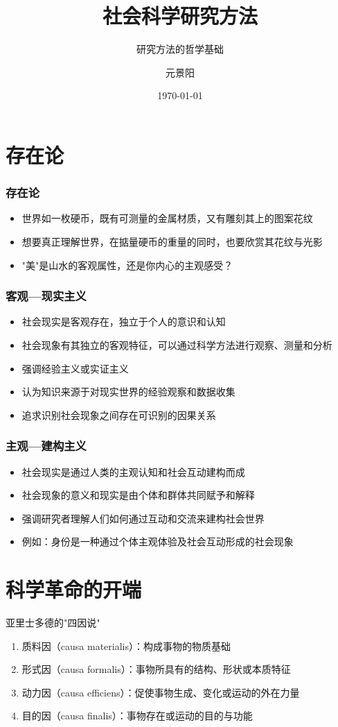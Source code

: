 \documentclass{beamer}
\title{社会科学研究方法}
\subtitle{研究方法的哲学基础}
\author{元景阳}
\institute{南京财经大学金融学院（已毕业）}
\date{\today}
\begin{document}
\kaishu

\frame{\titlepage}

\section{存在论}
\begin{frame}
\frametitle{存在论}
\begin{itemize}
\item 世界如一枚硬币，既有可测量的金属材质，又有雕刻其上的图案花纹
\item 想要真正理解世界，在掂量硬币的重量的同时，也要欣赏其花纹与光影
\item "美"是山水的客观属性，还是你内心的主观感受？
\end{itemize}
\end{frame}

\begin{frame}
\frametitle{客观---现实主义}
\begin{itemize}
\item 社会现实是客观存在，独立于个人的意识和认知
\item 社会现象有其独立的客观特征，可以通过科学方法进行观察、测量和分析
\item 强调经验主义或实证主义
\item 认为知识来源于对现实世界的经验观察和数据收集
\item 追求识别社会现象之间存在可识别的因果关系
\end{itemize}
\end{frame}

\begin{frame}
\frametitle{主观---建构主义}
\begin{itemize}
\item 社会现实是通过人类的主观认知和社会互动建构而成
\item 社会现象的意义和现实是由个体和群体共同赋予和解释
\item 强调研究者理解人们如何通过互动和交流来建构社会世界
\item 例如：身份是一种通过个体主观体验及社会互动形成的社会现象
\end{itemize}
\end{frame}

\section{科学革命的开端}

\begin{frame}{亚里士多德的"四因说"}
\begin{enumerate}
\item 质料因（causa materialis）：构成事物的物质基础
\item 形式因（causa formalis）：事物所具有的结构、形状或本质特征
\item 动力因（causa efficiens）：促使事物生成、变化或运动的外在力量
\item 目的因（causa finalis）：事物存在或运动的目的与功能
\end{enumerate}
\end{frame}
\end{document}
